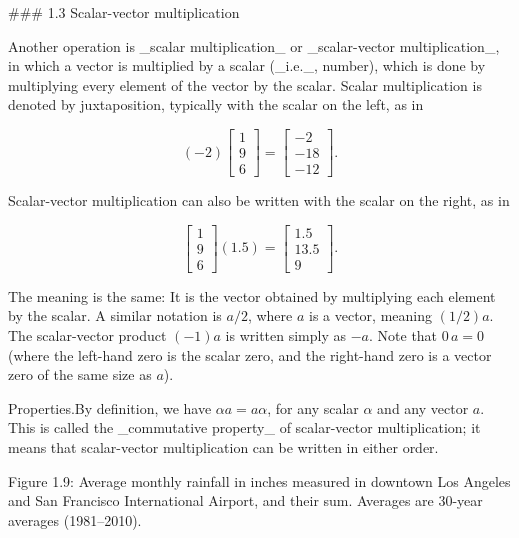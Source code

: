 

### 1.3 Scalar-vector multiplication

Another operation is _scalar multiplication_ or _scalar-vector multiplication_, in which a vector is multiplied by a scalar (_i.e._, number), which is done by multiplying every element of the vector by the scalar. Scalar multiplication is denoted by juxtaposition, typically with the scalar on the left, as in

\[(-2)\left[\begin{array}{c}1\\ 9\\ 6\end{array}\right]=\left[\begin{array}{c}-2\\ -18\\ -12\end{array}\right].\]

Scalar-vector multiplication can also be written with the scalar on the right, as in

\[\left[\begin{array}{c}1\\ 9\\ 6\end{array}\right](1.5)=\left[\begin{array}{c}1.5\\ 13.5\\ 9\end{array}\right].\]

The meaning is the same: It is the vector obtained by multiplying each element by the scalar. A similar notation is \(a/2\), where \(a\) is a vector, meaning \((1/2)a\). The scalar-vector product \((-1)a\) is written simply as \(-a\). Note that \(0\,a=0\) (where the left-hand zero is the scalar zero, and the right-hand zero is a vector zero of the same size as \(a\)).

Properties.By definition, we have \(\alpha a=a\alpha\), for any scalar \(\alpha\) and any vector \(a\). This is called the _commutative property_ of scalar-vector multiplication; it means that scalar-vector multiplication can be written in either order.

Figure 1.9: Average monthly rainfall in inches measured in downtown Los Angeles and San Francisco International Airport, and their sum. Averages are 30-year averages (1981–2010).

